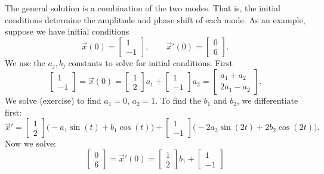 \begin{example}
The general solution is a combination of the two modes.  That is, the
initial conditions determine the amplitude and phase shift of each mode.
As an example, suppose we have initial conditions
\begin{equation*}
\vec{x}(0) = 
\begin{bmatrix} 1 \\ -1 \end{bmatrix}
, \qquad
\vec{x}'(0) = 
\begin{bmatrix} 0 \\ 6 \end{bmatrix} .
\end{equation*}
We use the $a_j, b_j$ constants to solve for initial conditions.  First
\begin{equation*}
\begin{bmatrix} 1 \\ -1 \end{bmatrix}
=
\vec{x}(0) = 
\begin{bmatrix} 1 \\ 2 \end{bmatrix}
a_1
+
\begin{bmatrix} 1 \\ -1 \end{bmatrix}
a_2 
=
\begin{bmatrix} a_1+a_2 \\2a_1 - a_2 \end{bmatrix} .
\end{equation*}
We solve (exercise) to find $a_1 = 0$, $a_2 = 1$.
To find the $b_1$ and $b_2$, we differentiate first:
\begin{equation*}
{\vec{x}}' = 
\begin{bmatrix} 1 \\ 2 \end{bmatrix}
\bigl( - a_1 \sin (t) + b_1 \cos (t) \bigr)
+
\begin{bmatrix} 1 \\ -1 \end{bmatrix}
\bigl( - 2a_2 \sin (2t) + 2 b_2 \cos (2t) \bigr) .
\end{equation*}
Now we solve:
\begin{equation*}
\begin{bmatrix} 0 \\ 6 \end{bmatrix}
=
{\vec{x}}'(0) = 
\begin{bmatrix} 1 \\ 2 \end{bmatrix}
b_1
+
\begin{bmatrix} 1 \\ -1 \end{bmatrix}

\end{equation*}
\end{example}
